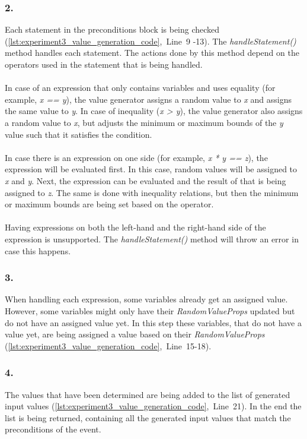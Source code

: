 \subsubsection{2. }
Each statement in the preconditions block is being checked (\autoref{lst:experiment3_value_generation_code},~Line~9 -13). The \textit{handleStatement()} method handles each statement. The actions done by this method depend on the operators used in the statement that is being handled.\\
\\
In case of an expression that only contains variables and uses equality (for example, \textit{x == y}), the value generator assigns a random value to \textit{x} and assigns the same value to \textit{y}. In case of inequality (\textit{x > y}), the value generator also assigns a random value to \textit{x}, but adjusts the minimum or maximum bounds of the \textit{y} value such that it satisfies the condition.\\
\\
In case there is an expression on one side (for example, \textit{x * y == z}), the expression will be evaluated first. In this case, random values will be assigned to \textit{x} and \textit{y}. Next, the expression can be evaluated and the result of that is being assigned to \textit{z}. The same is done with inequality relations, but then the minimum or maximum bounds are being set based on the operator.\\
\\
Having expressions on both the left-hand and the right-hand side of the expression is unsupported. The \textit{handleStatement()} method will throw an error in case this happens.

\subsubsection{3. }
When handling each expression, some variables already get an assigned value. However, some variables might only have their \textit{RandomValueProps} updated but do not have an assigned value yet. In this step these variables, that do not have a value yet, are being assigned a value based on their \textit{RandomValueProps} (\autoref{lst:experiment3_value_generation_code},~Line~15-18).

\subsubsection{4. }
The values that have been determined are being added to the list of generated input values (\autoref{lst:experiment3_value_generation_code},~Line~21). In the end the list is being returned, containing all the generated input values that match the preconditions of the event.

